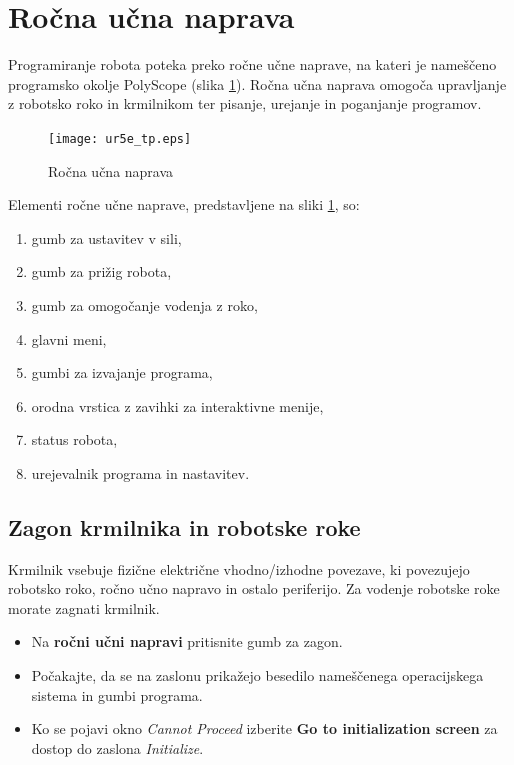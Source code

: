 \section{Ročna učna naprava}

Programiranje robota poteka preko ročne učne naprave, na kateri je nameščeno programsko okolje PolyScope (slika \ref{fig:ur_tp}). Ročna učna naprava omogoča upravljanje z robotsko roko in krmilnikom ter pisanje, urejanje in poganjanje programov.


\begin{figure}[!hbt]
\centering
\texttt{[image: ur5e\_tp.eps]}
\caption{Ročna učna naprava}
\label{fig:ur_tp}
\end{figure}

Elementi ročne učne naprave, predstavljene na sliki \ref{fig:ur_tp}, so:
\begin{enumerate}
  \item gumb za ustavitev v sili,
  \item gumb za prižig robota,
  \item gumb za omogočanje vodenja z roko,
  \item glavni meni,
  \item gumbi za izvajanje programa,
  \item orodna vrstica z zavihki za interaktivne menije,
  \item status robota,
  \item urejevalnik programa in nastavitev.
\end{enumerate}

\subsection{Zagon krmilnika in robotske roke}
\label{ch:zagon}

Krmilnik vsebuje fizične električne vhodno/izhodne povezave, ki povezujejo robotsko roko, ročno učno napravo in ostalo periferijo. Za vodenje robotske roke morate zagnati krmilnik.

\begin{itemize}
  \item Na \textbf{ročni učni napravi} pritisnite gumb za zagon.
  \item  Počakajte, da se na zaslonu prikažejo besedilo nameščenega operacijskega sistema in
gumbi programa.
  \item  Ko se pojavi okno \emph{Cannot Proceed} izberite \textbf{Go to initialization screen} za dostop do zaslona \emph{Initialize}.
\end{itemize}

